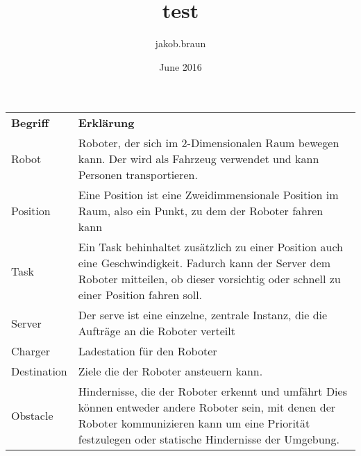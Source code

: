 \documentclass{article}
\title{test}
\author{jakob.braun }
\date{June 2016}
\begin{document}
	
	\begin{tabular}{ l p{10cm} }
		\textbf{Begriff} & \textbf{Erklärung}\\
		Robot & Roboter, der sich im 2-Dimensionalen Raum bewegen kann. Der wird
		als Fahrzeug verwendet und kann Personen transportieren.\\
		Position & Eine Position ist eine Zweidimmensionale Position im Raum,
		also ein Punkt, zu dem der Roboter fahren kann\\
		Task & Ein Task behinhaltet zusätzlich zu einer Position auch eine
		Geschwindigkeit. Fadurch kann der Server dem Roboter mitteilen, ob
		dieser vorsichtig oder schnell zu einer Position fahren
		soll.\\
		Server & Der serve ist eine einzelne, zentrale Instanz, die die Aufträge
		an die Roboter verteilt\\
		Charger & Ladestation für den Roboter\\
		Destination & Ziele die der Roboter ansteuern kann.\\
		Obstacle & Hindernisse, die der Roboter erkennt und umfährt Dies können
		entweder andere Roboter sein, mit denen der Roboter kommunizieren kann
		um eine Priorität festzulegen oder statische Hindernisse der
		Umgebung.\\
	\end{tabular}
	
	
\end{document}
